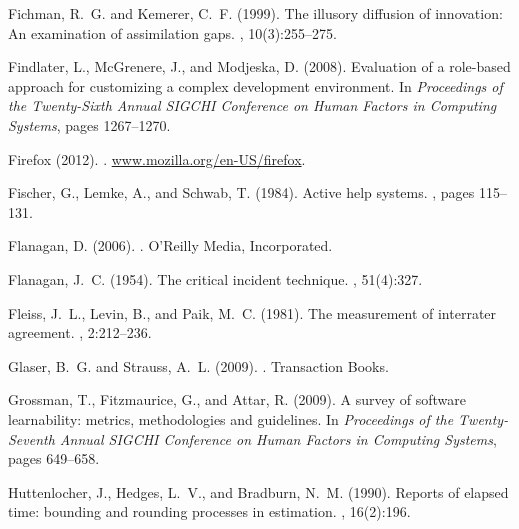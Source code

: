\documentclass[smallextended]{svjour3}
\begin{document}
\begin{thebibliography}{}
Fichman, R.~G. and Kemerer, C.~F. (1999).
\newblock The illusory diffusion of innovation: An examination of assimilation
  gaps.
, 10(3):255--275.

Findlater, L., McGrenere, J., and Modjeska, D. (2008).
\newblock Evaluation of a role-based approach for customizing a complex
  development environment.
\newblock In {\em Proceedings of the Twenty-Sixth Annual SIGCHI Conference on
  Human Factors in Computing Systems}, pages 1267--1270.

Firefox (2012).
.
\newblock \url{www.mozilla.org/en-US/firefox}.

Fischer, G., Lemke, A., and Schwab, T. (1984).
\newblock Active help systems.
, pages
  115--131.

Flanagan, D. (2006).
.
\newblock O'Reilly Media, Incorporated.

Flanagan, J.~C. (1954).
\newblock The critical incident technique.
, 51(4):327.

Fleiss, J.~L., Levin, B., and Paik, M.~C. (1981).
\newblock The measurement of interrater agreement.
, 2:212--236.

Glaser, B.~G. and Strauss, A.~L. (2009).
.
\newblock Transaction Books.

Grossman, T., Fitzmaurice, G., and Attar, R. (2009).
\newblock A survey of software learnability: metrics, methodologies and
  guidelines.
\newblock In {\em Proceedings of the Twenty-Seventh Annual SIGCHI Conference on
  Human Factors in Computing Systems}, pages 649--658.

Huttenlocher, J., Hedges, L.~V., and Bradburn, N.~M. (1990).
\newblock Reports of elapsed time: bounding and rounding processes in
  estimation.
, 16(2):196.


\end{thebibliography}
\end{document}
